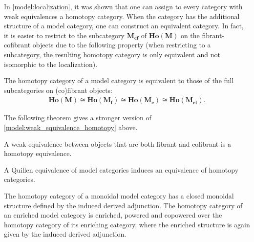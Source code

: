     In \cref{model:localization}, it was shown that one can assign to every category with weak equivalences a homotopy category. When the category has the additional structure of a model category, one can construct an equivalent category.
    In fact, it is easier to restrict to the subcategory $\mathbf{M_{cf}}$ of $\mathbf{Ho(M)}$ on the fibrant-cofibrant objects due to the following property (when restricting to a subcategory, the resulting homotopy category is only equivalent and not isomorphic to the localization).
    \begin{property}
        The homotopy category of a model category is equivalent to those of the full subcategories on (co)fibrant objects:
        \begin{gather}
            \mathbf{Ho(M)}\cong\mathbf{Ho(M_f)}\cong\mathbf{Ho(M_c)}\cong\mathbf{Ho(M_{cf})}.
        \end{gather}
    \end{property}

    The following theorem gives a stronger version of \cref{model:weak_equivalence_homotopy} above.
    \begin{theorem}[Whitehead]
        A weak equivalence between objects that are both fibrant and cofibrant is a homotopy equivalence.
    \end{theorem}

    \begin{property}
        A Quillen equivalence of model categories induces an equivalence of homotopy categories.
    \end{property}

    \begin{property}
        The homotopy category of a monoidal model category has a closed monoidal structure defined by the induced derived adjunction. The homotopy category of an enriched model category is enriched, powered and copowered over the homotopy category of its enriching category, where the enriched structure is again given by the induced derived adjunction.
    \end{property}

